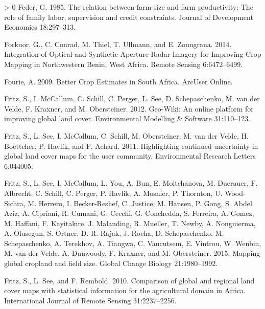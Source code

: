 \documentclass[11pt,a4paper]{article}
\newlength{\cslhangindent}
\newenvironment{CSLReferences}[3] %
 {%
  \setlength{\parindent}{0pt}
  \ifodd #1 \everypar{\setlength{\hangindent}{\cslhangindent}}\ignorespaces\fi
  \ifnum #2 > 0
  \setlength{\parskip}{#2\baselineskip}
  \fi
 }%
 {}
\begin{document}
\begin{CSLReferences}{1}{0}
\leavevmode\hypertarget{ref-federRelationFarmSize1985}{}%
Feder, G. 1985. The relation between farm size and farm productivity:
The role of family labor, supervision and credit constraints. Journal of
Development Economics 18:297--313.

\leavevmode\hypertarget{ref-forkuorIntegrationOpticalSynthetic2014}{}%
Forkuor, G., C. Conrad, M. Thiel, T. Ullmann, and E. Zoungrana. 2014.
Integration of {Optical} and {Synthetic Aperture Radar Imagery} for
{Improving Crop Mapping} in {Northwestern Benin}, {West Africa}. Remote
Sensing 6:6472--6499.

\leavevmode\hypertarget{ref-FourieBetterCropEstimates2009}{}%
Fourie, A. 2009. Better {Crop Estimates} in {South Africa}. ArcUser
Online.

\leavevmode\hypertarget{ref-FritzGeoWikionlineplatform2012}{}%
Fritz, S., I. McCallum, C. Schill, C. Perger, L. See, D. Schepaschenko,
M. van der Velde, F. Kraxner, and M. Obersteiner. 2012. Geo-{Wiki}: An
online platform for improving global land cover. Environmental Modelling
\& Software 31:110--123.

\leavevmode\hypertarget{ref-FritzHighlightingcontinueduncertainty2011}{}%
Fritz, S., L. See, I. McCallum, C. Schill, M. Obersteiner, M. van der
Velde, H. Boettcher, P. Havlík, and F. Achard. 2011. Highlighting
continued uncertainty in global land cover maps for the user community.
Environmental Research Letters 6:044005.

\leavevmode\hypertarget{ref-FritzMappingglobalcropland2015}{}%
Fritz, S., L. See, I. McCallum, L. You, A. Bun, E. Moltchanova, M.
Duerauer, F. Albrecht, C. Schill, C. Perger, P. Havlik, A. Mosnier, P.
Thornton, U. Wood-Sichra, M. Herrero, I. Becker-Reshef, C. Justice, M.
Hansen, P. Gong, S. Abdel Aziz, A. Cipriani, R. Cumani, G. Cecchi, G.
Conchedda, S. Ferreira, A. Gomez, M. Haffani, F. Kayitakire, J.
Malanding, R. Mueller, T. Newby, A. Nonguierma, A. Olusegun, S. Ortner,
D. R. Rajak, J. Rocha, D. Schepaschenko, M. Schepaschenko, A. Terekhov,
A. Tiangwa, C. Vancutsem, E. Vintrou, W. Wenbin, M. van der Velde, A.
Dunwoody, F. Kraxner, and M. Obersteiner. 2015. Mapping global cropland
and field size. Global Change Biology 21:1980--1992.

\leavevmode\hypertarget{ref-FritzComparisonglobalregional2010}{}%
Fritz, S., L. See, and F. Rembold. 2010. Comparison of global and
regional land cover maps with statistical information for the
agricultural domain in {Africa}. International Journal of Remote Sensing
31:2237--2256.


\end{CSLReferences}
\end{document}
